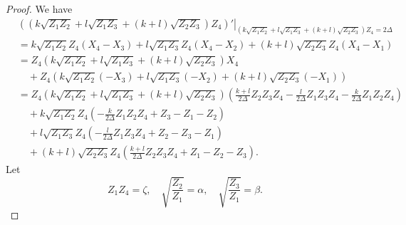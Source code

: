 \documentclass[11pt,letterpaper]{amsart}
\theoremstyle{definition}
\numberwithin{equation}{section}
\begin{document}
\begin{proof}
We have 
\begin{equation}
\label{eqn: technical computation+ 1-1}
\begin{split}
&\left.\left(\left(k\sqrt{Z_1Z_2}+l\sqrt{Z_1Z_3}+(k+l)\sqrt{Z_2Z_3}\right)Z_4\right)'\right|_{\left(k\sqrt{Z_1Z_2}+l\sqrt{Z_1Z_3}+(k+l)\sqrt{Z_2Z_3}\right)Z_4=2\Delta}
\\
&=k\sqrt{Z_1Z_2}Z_4(X_4-X_3)+l\sqrt{Z_1Z_3}Z_4(X_4-X_2)+(k+l)\sqrt{Z_2Z_3}Z_4(X_4-X_1)\\
&=Z_4\left(k\sqrt{Z_1Z_2}+l\sqrt{Z_1Z_3}+(k+l)\sqrt{Z_2Z_3}\right)X_4\\
&\quad +Z_4(k\sqrt{Z_1Z_2}(-X_3)+l\sqrt{Z_1Z_3}(-X_2)+(k+l)\sqrt{Z_2Z_3}(-X_1))\\
&=Z_4\left(k\sqrt{Z_1Z_2}+l\sqrt{Z_1Z_3}+(k+l)\sqrt{Z_2Z_3}\right)\left(\frac{k+l}{2\Delta}Z_2Z_3Z_4-\frac{l}{2\Delta}Z_1Z_3Z_4-\frac{k}{2\Delta}Z_1Z_2Z_4\right) \\
&\quad +k\sqrt{Z_1Z_2}Z_4\left(-\frac{k}{2\Delta}Z_1Z_2Z_4+Z_3-Z_1-Z_2\right)\\
&\quad +l\sqrt{Z_1Z_3}Z_4\left(-\frac{l}{2\Delta}Z_1Z_3Z_4+Z_2-Z_3-Z_1\right)\\
&\quad +(k+l)\sqrt{Z_2Z_3}Z_4\left(\frac{k+l}{2\Delta}Z_2Z_3Z_4+Z_1-Z_2-Z_3\right).
\end{split}
\end{equation}
Let
\begin{equation}
\label{eqn: alpha beta gamma in techinal}
Z_1Z_4=\zeta,\quad \sqrt{\frac{Z_2}{Z_1}}=\alpha, \quad  \sqrt{\frac{Z_3}{Z_1}}=\beta.
\end{equation}


\end{proof}
\end{document}
